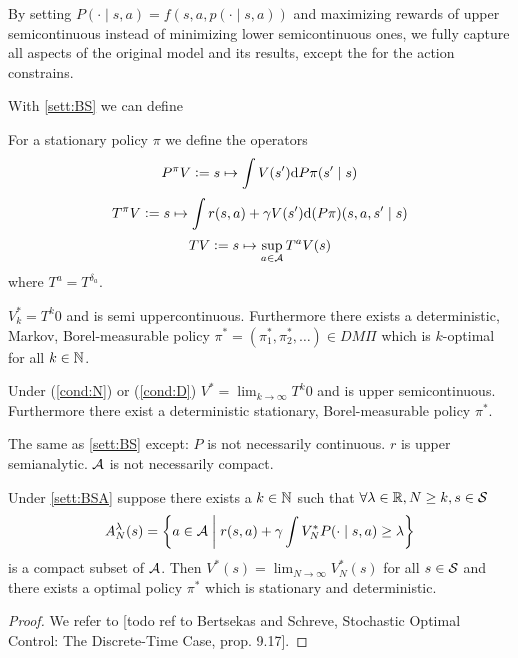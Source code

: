 \documentclass{article}
\begin{document}
By setting $P(\cdot \mid s, a) = f(s, a, p(\cdot \mid s, a))$
and maximizing rewards of upper semicontinuous instead of
minimizing lower semicontinuous ones, we fully capture
all aspects of the original model and its results,
except the for the action constrains.

With \cref{sett:BS} we can define

\begin{defn}
  For a stationary policy $\pi$ we define
  the operators 
  \[ P^\pi V \vcentcolon= s \mapsto \int V(s') \mathrm{d} P\pi(s' \mid s) \]
  \[ T^\pi V \vcentcolon= s \mapsto \int r(s, a)
  + \gamma V(s') \mathrm{d} (P \pi)(s, a, s'\mid s) \]
  \[ T V \vcentcolon= s \mapsto \sup_{a \in \mathcal{A}} T^a V(s) \]
  where $T^a = T^{\delta_a}$.
\end{defn}

\begin{prop}
  $V^*_k = T^k 0$ and is semi uppercontinuous.
  Furthermore there exists a deterministic, Markov, Borel-measurable policy
  $\pi^* = (\pi^*_1, \pi^*_2, \dots) \in DM\Pi$
  which is $k$-optimal for all $k \in \mathbb{N}$.
\end{prop}

\begin{thm} 
  Under (\cref{cond:N}) or (\cref{cond:D})
  $V^* = \lim_{k\to\infty} T^k 0$ and is upper semicontinuous.
  Furthermore there exist a deterministic
  stationary, Borel-measurable policy $\pi^*$.
\end{thm}

\begin{sett}[BS Analytic]
  The same as \cref{sett:BS} except:
  $P$ is not necessarily continuous.
  $r$ is upper semianalytic.
  $\mathcal{A}$ is not necessarily compact.
  \label{sett:BSA}
\end{sett}

\begin{thm}
  Under \cref{sett:BSA}
  suppose there exists a $k \in \mathbb{N}$ such that
  $\forall \lambda \in \mathbb{R}, N \geq k, s \in \mathcal{S}$
  \[ A^\lambda_N(s) = \left\{ a \in \mathcal{A} \;\middle\vert\; r(s, a)
  + \gamma \int V^*_N P(\cdot \mid s, a) \geq \lambda \right\} \]
  is a compact subset of $\mathcal{A}$.
  Then $V^*(s) = \lim_{N \to \infty} V^*_N(s)$ for all $s \in \mathcal{S}$
  and there exists a optimal policy $\pi^*$ which is stationary
  and deterministic.
\end{thm}
\begin{proof}
  We refer to [todo ref to Bertsekas and Schreve, Stochastic Optimal Control:
  The Discrete-Time Case, prop. 9.17].
\end{proof}
\end{document}
